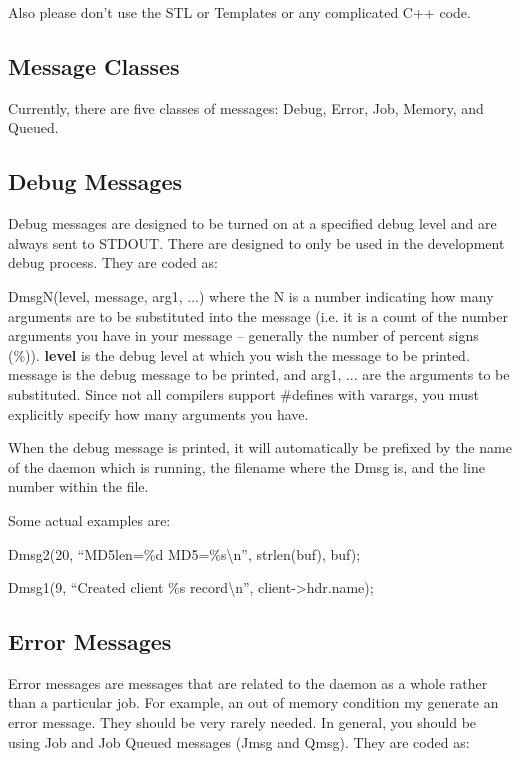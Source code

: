 Also please don't use the STL or Templates or any complicated C++ code.

\subsection{Message Classes}

Currently, there are five classes of messages: Debug, Error, Job, Memory,
and Queued.

\subsection{Debug Messages}

Debug messages are designed to be turned on at a specified debug level and are
always sent to STDOUT. There are designed to only be used in the development
debug process. They are coded as:

DmsgN(level, message, arg1, ...) where the N is a number indicating how many
arguments are to be substituted into the message (i.e. it is a count of the
number arguments you have in your message -- generally the number of percent
signs (\%)). {\bf level} is the debug level at which you wish the message to
be printed. message is the debug message to be printed, and arg1, ... are the
arguments to be substituted. Since not all compilers support \#defines with
varargs, you must explicitly specify how many arguments you have.

When the debug message is printed, it will automatically be prefixed by the
name of the daemon which is running, the filename where the Dmsg is, and the
line number within the file.

Some actual examples are:

Dmsg2(20, ``MD5len=\%d MD5=\%s\textbackslash{}n'', strlen(buf), buf);

Dmsg1(9, ``Created client \%s record\textbackslash{}n'', client->hdr.name);

\subsection{Error Messages}

Error messages are messages that are related to the daemon as a whole rather
than a particular job. For example, an out of memory condition my generate an
error message. They should be very rarely needed. In general, you should be
using Job and Job Queued messages (Jmsg and Qmsg). They are coded as:

